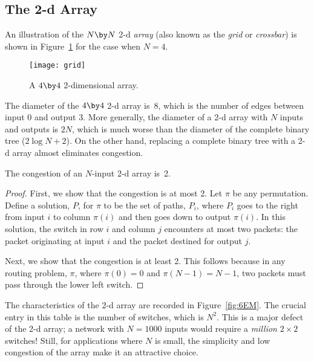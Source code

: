 \subsection{The 2-d Array}\label{sec:2d-array}

An illustration of the $N \by N$ 2-d \emph{array} (also known as the
\emph{grid} or \emph{crossbar}) is shown in Figure~\ref{fig:6EL} for
the case when $N = 4$.

\begin{figure}

\texttt{[image: grid]}

\caption{A $4 \by 4$ 2-dimensional array.}

\label{fig:6EL}

\end{figure}

The diameter of the $4 \by 4$ 2-d array is~8, which is the number of
edges between input 0 and output 3.  More generally, the diameter of a
2-d array with $N$ inputs and outputs is $2N$, which is much worse
than the diameter of the complete binary tree ($2 \log N + 2$).  On
the other hand, replacing a complete binary tree with a 2-d array
almost eliminates congestion.

\begin{theorem}
The congestion of an $N$-input 2-d array is~2.
\end{theorem}

\begin{proof}
First, we show that the congestion is at most 2.  Let $\pi$ be any
permutation.  Define a solution, $P$, for $\pi$ to be the set of
paths, $P_i$, where $P_i$ goes to the right from input $i$ to column
$\pi(i)$ and then goes down to output $\pi(i)$.  In this solution, the
switch in row $i$ and column $j$ encounters at most two packets: the
packet originating at input $i$ and the packet destined for output
$j$.

Next, we show that the congestion is at least 2.  This follows because in
any routing problem, $\pi$, where $\pi(0) = 0$ and $\pi(N-1) =
N-1$, two packets must pass through the lower left switch.
\end{proof}

The characteristics of the 2-d array are recorded in
Figure~\ref{fig:6EM}. The crucial entry in this table is the number of
switches, which is $N^2$.  This is a major defect of the 2-d array;
a network with $N = 1000$ inputs would require a \emph{million} $2
\times 2$ switches!  Still, for applications where $N$ is small, the
simplicity and low congestion of the array make it an attractive
choice.


